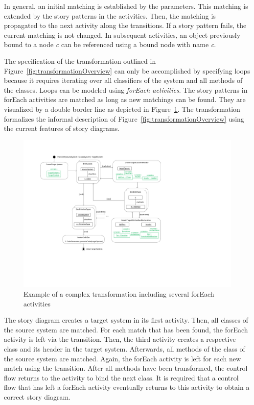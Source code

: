 In general, an initial matching is established by the parameters. This matching is extended by the story patterns in the activities. Then, the matching is propagated to the next activity along the transitions. If a story pattern fails, the current matching is not changed. In subsequent activities, an object previously bound to a node \emph{c} can be referenced using a bound node with name \emph{c}.

The specification of the transformation outlined in Figure~\ref{fig:transformationOverview} can only be accomplished by specifying loops because it requires iterating over all classifiers of the system and all methods of the classes. Loops can be modeled using \emph{forEach activities}.
The story patterns in forEach activities are matched as long as new matchings can be found.
They are visualized by a double border line as depicted in Figure~\ref{fig:forEach}. The transformation formalizes the informal description of Figure~\ref{fig:transformationOverview} using the current features of story diagrams.

\begin{figure}[htb]
\begin{center}
  \includegraphics[width=\textwidth]{figures/ForEach}
  \caption{Example of a complex transformation including several forEach activities}
  \label{fig:forEach}
\end{center}
\end{figure}

The story diagram creates a target system in its first activity. Then, all classes of the source system  are matched. For each match that has been found, the forEach activity is left via the  transition. Then, the third activity creates a respective class and its header in the target system. Afterwards, all methods of the class  of the source system are matched. Again, the forEach activity is left for each new match using the  transition. After all methods have been transformed, the control flow returns to the activity  to bind the next class. It is required that a control flow that has left a forEach activity eventually returns to this activity to obtain a correct story diagram.

